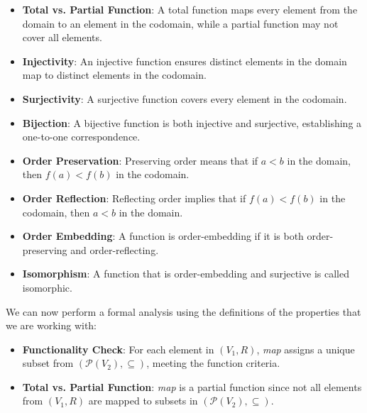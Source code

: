 \documentclass[12pt]{article}
\begin{document}
\begin{spacing}{1.5}
\begin{itemize}
		\item \textbf{Total vs. Partial Function}: A total function maps every element from the domain to an element in the codomain, while a partial function may not cover all elements.
		      		          
		\item \textbf{Injectivity}: An injective function ensures distinct elements in the domain map to distinct elements in the codomain.
		      		          
		\item \textbf{Surjectivity}: A surjective function covers every element in the codomain.
		      		          
		\item \textbf{Bijection}: A bijective function is both injective and surjective, establishing a one-to-one correspondence.
		      		          
		\item \textbf{Order Preservation}: Preserving order means that if $a < b$ in the domain, then $f(a) < f(b)$ in the codomain.
		      		          
		\item \textbf{Order Reflection}: Reflecting order implies that if $f(a) < f(b)$ in the codomain, then $a < b$ in the domain.
		      		          
		\item \textbf{Order Embedding}: A function is order-embedding if it is both order-preserving and order-reflecting.
		      		          
		\item \textbf{Isomorphism}: A function that is order-embedding and surjective is called isomorphic. 
	\end{itemize}
		
	\noindent We can now perform a formal analysis using the definitions of the properties that we are working with:
		
	\begin{itemize}
		\item \textbf{Functionality Check}: For each element in $(V_1, R)$, \textit{map} assigns a unique subset from $(\mathcal{P}(V_2), \subseteq)$, meeting the function criteria.
		      		      
		\item \textbf{Total vs. Partial Function}: \textit{map} is a partial function since not all elements from $(V_1, R)$ are mapped to subsets in $(\mathcal{P}(V_2), \subseteq)$.
		      		      

\end{itemize}
\end{spacing}
\end{document}
